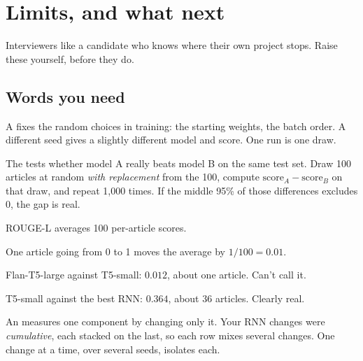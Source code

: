 \chapter{Limits, and what next}
\label{ch:limits}

Interviewers like a candidate who knows where their own project stops. Raise these yourself, before they do.

\section{Words you need}

\begin{definition}
A  fixes the random choices in training: the starting weights, the batch order. A different seed gives a slightly different model and score. One run is one draw.
\end{definition}

\begin{definition}
The  tests whether model A really beats model B on the same test set. Draw 100 articles at random \emph{with replacement} from the 100, compute $\text{score}_A - \text{score}_B$ on that draw, and repeat 1,000 times. If the middle 95\% of those differences excludes 0, the gap is real.
\end{definition}

\begin{example}
ROUGE-L averages 100 per-article scores.
\begin{steps}
  \item One article going from 0 to 1 moves the average by $1/100 = 0.01$.
  \item Flan-T5-large against T5-small: $0.012$, about one article. Can't call it.
  \item T5-small against the best RNN: $0.364$, about 36 articles. Clearly real.
\end{steps}
\end{example}

\begin{definition}[Ablation]
An  measures one component by changing only it. Your RNN changes were \emph{cumulative}, each stacked on the last, so each row mixes several changes. One change at a time, over several seeds, isolates each.
\end{definition}

